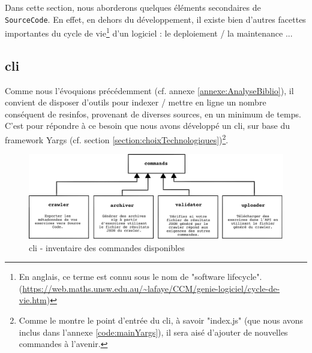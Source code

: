 Dans cette section, nous aborderons quelques éléments secondaires de \texttt{SourceCode}.
En effet, en dehors du développement, il existe bien d'autres facettes importantes du cycle de vie\footnote{
    En anglais, ce terme est connu sous le nom de "software lifecycle". (\url{https://web.maths.unsw.edu.au/~lafaye/CCM/genie-logiciel/cycle-de-vie.htm})
} d'un logiciel : le \gls{deploiement} / la \gls{maintenance}  ...

\subsection{\texorpdfstring{\Gls{cli}}{CLI}}

Comme nous l'évoquions précédemment (cf. annexe \ref{annexe:AnalyseBiblio}), il convient de disposer d'outils pour indexer / mettre en ligne un nombre conséquent de 
\glspl{resinfo}, provenant de diverses sources, en un minimum de temps. C'est pour répondre à ce besoin que nous avons développé un \Gls{cli}, sur base du framework Yargs
(cf. section \ref{section:choixTechnologiques})\footnote{
    Comme le montre le point d'entrée du \Gls{cli}, à savoir "index.js" (que nous avons inclus dans l'annexe \ref{code:mainYargs}), il sera aisé d'ajouter de nouvelles commandes à l'avenir.
}.

\begin{figure}[H]
    \includegraphics[width=\textwidth,height=\textheight,keepaspectratio]{images/serveur/CLI.jpg}
    \centering
    \caption{\Gls{cli} - inventaire des commandes disponibles}
    \label{fig:cliCommands}
\end{figure}


